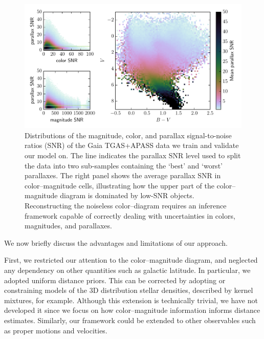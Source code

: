 \documentclass[manuscript, letterpaper]{aastex6}
\makeatletter
\let\origsubsection\subsection
\renewcommand\subsection{\@ifstar{\starsubsection}{\nostarsubsection}}
\newcommand\nostarsubsection[1]{\subsectionprelude\origsubsection{#1}}
\newcommand\starsubsection[1]{\subsectionprelude\origsubsection*{#1}}
\newcommand\subsectionprelude{\vspace{1em}}
\makeatother
\begin{document}
\subsection{Discussion}

\begin{figure}
\hspace*{-3mm}\includegraphics[width=15.75cm]{datasummary.pdf}
\caption{Distributions of the magnitude, color, and parallax signal-to-noise ratios (SNR) of the Gaia TGAS+APASS data we train and validate our model on. The line indicates the parallax SNR level used to split the data into two sub-samples containing the `best' and `worst' parallaxes. The right panel shows the average parallax SNR in color--magnitude cells, illustrating how the upper part of the color--magnitude diagram is dominated by low-SNR objects. Reconstructing the noiseless color--diagram requires an inference framework capable of correctly dealing with uncertainties in colors, magnitudes, and parallaxes.}
\label{fig:datasummary}
\end{figure}

We now briefly discuss the advantages and limitations of our approach.

First, we restricted our attention to the color--magnitude diagram, and neglected any dependency on other quantities such as galactic latitude.
In particular, we adopted uniform distance priors.
This can be corrected by adopting or constraining models of the 3D distribution stellar densities, described by kernel mixtures, for example. 
Although this extension is technically trivial, we have not developed it since we focus on how color--magnitude information informs distance estimates.
Similarly, our framework could be extended to other observables such as proper motions and velocities.
\end{document}
